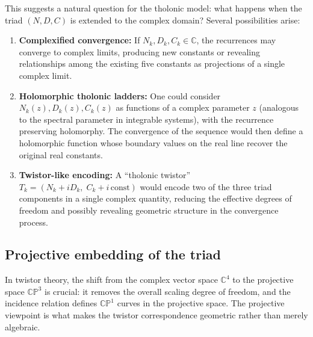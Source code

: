 \documentclass[12pt]{article}
\begin{document}
This suggests a natural question for the tholonic model: what happens when the triad
$(N, D, C)$ is extended to the complex domain?  Several possibilities arise:
\begin{enumerate}
  \item \textbf{Complexified convergence:} If $N_k, D_k, C_k \in \mathbb{C}$, the
        recurrences may converge to complex limits, producing new constants or revealing
        relationships among the existing five constants as projections of a single complex
        limit.
  \item \textbf{Holomorphic tholonic ladders:} One could consider $N_k(z), D_k(z),
        C_k(z)$ as functions of a complex parameter $z$ (analogous to the spectral
        parameter in integrable systems), with the recurrence preserving holomorphy.  The
        convergence of the sequence would then define a holomorphic function whose boundary
        values on the real line recover the original real constants.
  \item \textbf{Twistor-like encoding:} A ``tholonic twistor''
        $T_k = (N_k + i D_k,\; C_k + i\,\mathrm{const})$ would encode two of the three
        triad components in a single complex quantity, reducing the effective degrees of
        freedom and possibly revealing geometric structure in the convergence process.
\end{enumerate}

\subsection{Projective embedding of the triad}\label{sec:projective}

In twistor theory, the shift from the complex vector space $\mathbb{C}^4$ to the
projective space $\mathbb{CP}^3$ is crucial: it removes the overall scaling degree of
freedom, and the incidence relation defines $\mathbb{CP}^1$ curves in the projective
space.  The projective viewpoint is what makes the twistor correspondence geometric
rather than merely algebraic.
\end{document}

